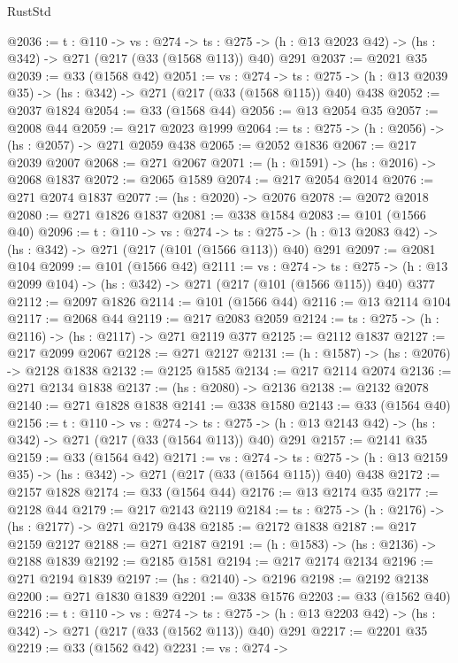 \begin{lexlean}{RustStd}
\begin{coremodule}
@2036 := {t : @110} ->
  {vs : @274} ->
  {ts : @275} -> (h : @13 @2023 @42) -> (hs : @342) -> @271 (@217 (@33 (@1568 @113)) @40) @291
@2037 := @2021 @35
@2039 := @33 (@1568 @42)
@2051 := {vs : @274} ->
  {ts : @275} -> (h : @13 @2039 @35) -> (hs : @342) -> @271 (@217 (@33 (@1568 @115)) @40) @438
@2052 := @2037 @1824
@2054 := @33 (@1568 @44)
@2056 := @13 @2054 @35
@2057 := @2008 @44
@2059 := @217 @2023 @1999
@2064 := {ts : @275} -> (h : @2056) -> (hs : @2057) -> @271 @2059 @438
@2065 := @2052 @1836
@2067 := @217 @2039 @2007
@2068 := @271 @2067
@2071 := (h : @1591) -> (hs : @2016) -> @2068 @1837
@2072 := @2065 @1589
@2074 := @217 @2054 @2014
@2076 := @271 @2074 @1837
@2077 := (hs : @2020) -> @2076
@2078 := @2072 @2018
@2080 := @271 @1826 @1837
@2081 := @338 @1584
@2083 := @101 (@1566 @40)
@2096 := {t : @110} ->
  {vs : @274} ->
  {ts : @275} -> (h : @13 @2083 @42) -> (hs : @342) -> @271 (@217 (@101 (@1566 @113)) @40) @291
@2097 := @2081 @104
@2099 := @101 (@1566 @42)
@2111 := {vs : @274} ->
  {ts : @275} -> (h : @13 @2099 @104) -> (hs : @342) -> @271 (@217 (@101 (@1566 @115)) @40) @377
@2112 := @2097 @1826
@2114 := @101 (@1566 @44)
@2116 := @13 @2114 @104
@2117 := @2068 @44
@2119 := @217 @2083 @2059
@2124 := {ts : @275} -> (h : @2116) -> (hs : @2117) -> @271 @2119 @377
@2125 := @2112 @1837
@2127 := @217 @2099 @2067
@2128 := @271 @2127
@2131 := (h : @1587) -> (hs : @2076) -> @2128 @1838
@2132 := @2125 @1585
@2134 := @217 @2114 @2074
@2136 := @271 @2134 @1838
@2137 := (hs : @2080) -> @2136
@2138 := @2132 @2078
@2140 := @271 @1828 @1838
@2141 := @338 @1580
@2143 := @33 (@1564 @40)
@2156 := {t : @110} ->
  {vs : @274} ->
  {ts : @275} -> (h : @13 @2143 @42) -> (hs : @342) -> @271 (@217 (@33 (@1564 @113)) @40) @291
@2157 := @2141 @35
@2159 := @33 (@1564 @42)
@2171 := {vs : @274} ->
  {ts : @275} -> (h : @13 @2159 @35) -> (hs : @342) -> @271 (@217 (@33 (@1564 @115)) @40) @438
@2172 := @2157 @1828
@2174 := @33 (@1564 @44)
@2176 := @13 @2174 @35
@2177 := @2128 @44
@2179 := @217 @2143 @2119
@2184 := {ts : @275} -> (h : @2176) -> (hs : @2177) -> @271 @2179 @438
@2185 := @2172 @1838
@2187 := @217 @2159 @2127
@2188 := @271 @2187
@2191 := (h : @1583) -> (hs : @2136) -> @2188 @1839
@2192 := @2185 @1581
@2194 := @217 @2174 @2134
@2196 := @271 @2194 @1839
@2197 := (hs : @2140) -> @2196
@2198 := @2192 @2138
@2200 := @271 @1830 @1839
@2201 := @338 @1576
@2203 := @33 (@1562 @40)
@2216 := {t : @110} ->
  {vs : @274} ->
  {ts : @275} -> (h : @13 @2203 @42) -> (hs : @342) -> @271 (@217 (@33 (@1562 @113)) @40) @291
@2217 := @2201 @35
@2219 := @33 (@1562 @42)
@2231 := {vs : @274} ->

\end{coremodule}
\end{lexlean}
